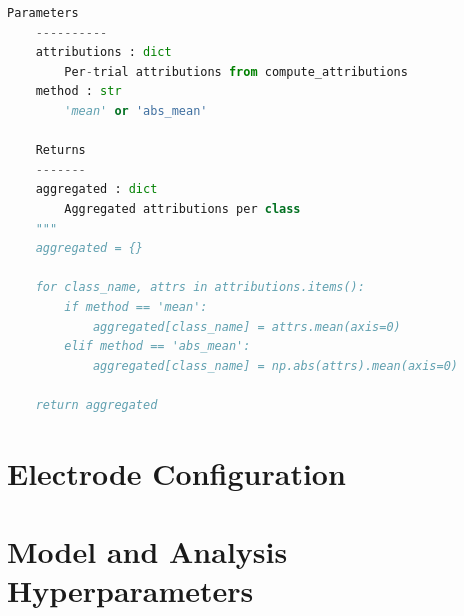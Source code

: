 \begin{lstlisting}[language=Python, caption={Integrated Gradients analysis}, label={lst:ig}]
    Parameters
    ----------
    attributions : dict
        Per-trial attributions from compute_attributions
    method : str
        'mean' or 'abs_mean'
    
    Returns
    -------
    aggregated : dict
        Aggregated attributions per class
    """
    aggregated = {}
    
    for class_name, attrs in attributions.items():
        if method == 'mean':
            aggregated[class_name] = attrs.mean(axis=0)
        elif method == 'abs_mean':
            aggregated[class_name] = np.abs(attrs).mean(axis=0)
    
    return aggregated
\end{lstlisting}


\section{Electrode Configuration}
\label{app:electrodes}

%
%
%


\section{Model and Analysis Hyperparameters}
\label{app:hyperparameters}

%
%
